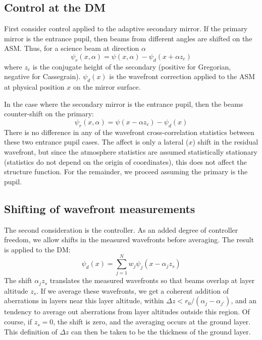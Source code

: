 \documentclass[11pt, oneside]{article}   	%
\begin{document}
\subsection{Control at the DM}
First consider control applied to the adaptive secondary mirror. If the primary mirror is the entrance pupil, then beams from different angles are shifted on the ASM. Thus, for a science beam at direction $\alpha$
\begin{equation}
\label{eqn:ASMcontrol_priPupil}
\psi_r(x,\alpha) = \psi(x,\alpha) - \psi_d(x+\alpha z_c)
\end{equation}
where $z_c$ is the conjugate height of the secondary (positive for Gregorian, negative for Cassegrain). $\psi_d(x)$ is the wavefront correction applied to the ASM at physical position $x$ on the mirror surface.

In the case where the secondary mirror is the entrance pupil, then the beams counter-shift on the primary:
\begin{equation}
\label{eqn:ASMcontrol_secPupil}
\psi_r(x,\alpha) = \psi(x-\alpha z_c) - \psi_d(x)
\end{equation}
There is no difference in any of the wavefront cross-correlation statistics between these two entrance pupil cases. The affect is only a lateral ($x$) shift in the residual wavefront, but since the atmosphere statistics are assumed statistically stationary (statistics do not depend on the origin of coordinates), this does not affect the structure function. For the remainder, we proceed assuming the primary is the pupil.

\subsection{Shifting of wavefront measurements}
The second consideration is the controller. As an added degree of controller freedom, we allow shifts in the measured wavefronts before   averaging. The result is applied to the DM:
\begin{equation}
\label{eqn:shiftedWavefrontControl}
\psi_d(x) = \sum_{j=1}^N w_j \psi_j(x-\alpha_j z_s)
\end{equation}
The shift $\alpha_j z_s$ translates the measured wavefronts so that beams overlap at layer altitude $z_s$. If we average these wavefronts, we get a coherent addition of aberrations in layers near this layer altitude, within $\Delta z < r_0/(\alpha_j-\alpha_{j'})$, and an tendency to average out aberrations from layer altitudes outside this region. Of course, if $z_s=0$, the shift is zero, and the averaging occurs at the ground layer. This definition of $\Delta z$ can then be taken to be the thickness of the ground layer.
\end{document}

